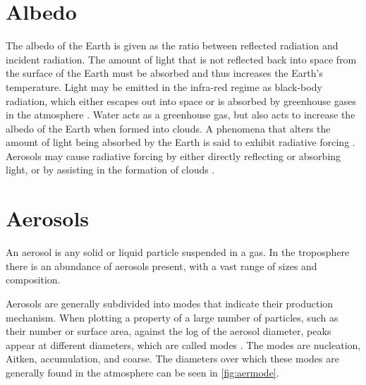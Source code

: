 
\section{Albedo}
\label{sec:albedo}

The albedo of the Earth is given as the ratio between reflected radiation and incident radiation. The amount of light that is not reflected back into space from the surface of the Earth must be absorbed and thus increases the Earth's temperature. Light may be emitted in the infra-red regime as black-body radiation, which either escapes out into space or is absorbed by greenhouse gases in the atmosphere \citep{Lashof:1990wu}. Water acts as a greenhouse gas, but also acts to increase the albedo of the Earth when formed into clouds. A phenomena that alters the amount of light being absorbed by the Earth is said to exhibit radiative forcing \citep{intergovernmentalpanelonclimatechange:2015fa}. Aerosols may cause radiative forcing by either directly reflecting or absorbing light, or by assisting in the formation of clouds \citep[Chapter 4]{seinfeld2012atmospheric}.



	\section{Aerosols}
	\label{sec:aerosols}

	An aerosol is any solid or liquid particle suspended in a gas. In the troposphere there is an abundance of aerosols present, with a vast range of sizes and composition.

	Aerosols are generally subdivided into modes that indicate their production mechanism. When plotting a property of a large number of particles, such as their number or surface area, against the log of the aerosol diameter, peaks appear at different diameters, which are called modes \citep[Chapter 8]{seinfeld2012atmospheric}. The modes are nucleation, Aitken, accumulation, and coarse. The diameters over which these modes are generally found in the atmosphere can be seen in \cref{fig:aermode}.

